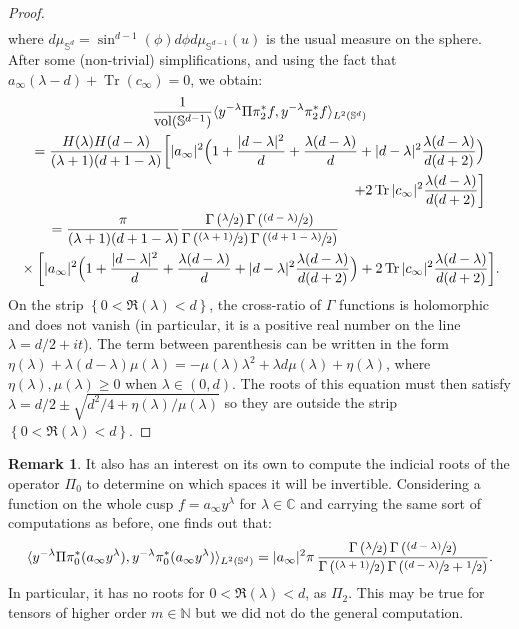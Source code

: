 \documentclass[JEP,XML,SOM,Unicode,NoFloatCountersInSection]{cedram}
\newcommand{\psfrac}[2]{\sfrac{(#1)}{#2}}
\newcommand{\C}{\mathbb{C}}
\newcommand{\N}{\mathbb{N}}
\newcommand{\Ss}{\mathbb{S}}
\DeclareMathOperator{\vol}{\mathrm{vol}}
\DeclareMathOperator{\Tr}{Tr}
\theoremstyle{plain}
\theoremstyle{definition}
\newtheorem{remark}{Remark}[section]
\begin{document}
\begin{proof}
\begin{multline*}
\end{multline*}
where $d\mu_{\Ss^d} = \sin^{d-1}(\phi) d\phi d\mu_{\Ss^{d-1}}(u)$ is the usual measure on the sphere. After some (non-trivial) simplifications, and using the fact that $a_\infty(\lambda-d)+\Tr(c_\infty) = 0$, we obtain:
\begin{multline*}
\frac{1}{\vol(\Ss^{d-1})}\langle y^{-\lambda} \Pi \pi_2^\ast f,y^{-\lambda}\pi_2^\ast f \rangle_{L^2(\Ss^d)} \\
= \dfrac{H(\lambda)H(d-\lambda)}{(\lambda+1)(d+1-\lambda)}\biggl[|a_\infty|^2\Bigl(1+\dfrac{|d-\lambda|^2}{d}+\dfrac{\lambda(d-\lambda)}{d}+|d-\lambda|^2\dfrac{\lambda(d-\lambda)}{d(d+2)}\Bigr)\\
\shoveright{+ 2\Tr |c_\infty|^2 \dfrac{\lambda(d-\lambda)}{d(d+2)} \biggr]} \\
\shoveleft{\hspace*{.5cm}= \dfrac{\pi}{(\lambda+1)(d+1-\lambda)} \dfrac{\Gamma\left(\sfrac{\lambda}{2}\right)\Gamma\left(\psfrac{d-\lambda}{2}\right)}{\Gamma\left(\psfrac{\lambda+1}{2}\right)\Gamma\left(\psfrac{d+1-\lambda}{2}\right)}} \\
{}\times \biggl[|a_\infty|^2\Bigl(1+\dfrac{|d-\lambda|^2}{d}+\dfrac{\lambda(d-\lambda)}{d}+|d-\lambda|^2\dfrac{\lambda(d-\lambda)}{d(d+2)}\Bigr) + 2\Tr |c_\infty|^2 \dfrac{\lambda(d-\lambda)}{d(d+2)} \biggr].
\end{multline*}
On the strip $\left\{0 < \Re(\lambda) < d\right\}$, the cross-ratio of $\Gamma$ functions is holomorphic and does not vanish (in particular, it is a positive real number on the line $\lambda=d/2+it$). The term between parenthesis can be written in the form $\eta(\lambda)+\lambda(d-\lambda)\mu(\lambda) = -\mu(\lambda)\lambda^2 + \lambda d \mu(\lambda) + \eta(\lambda)$, where $\eta(\lambda),\mu(\lambda) \geq 0$ when $\lambda \in (0,d)$. The roots of this equation must then satisfy $\lambda = d/2 \pm \sqrt{d^2/4+\eta(\lambda)/\mu(\lambda)}$ so they are outside the strip $\left\{0 < \Re(\lambda) < d\right\}$.
\end{proof}

\begin{remark}
\label{remark:pi0}
It also has an interest on its own to compute the indicial roots of the operator $\Pi_0$ to determine on which spaces it will be invertible. Considering a function on the whole cusp $f = a_\infty y^\lambda$ for $\lambda \in \C$ and carrying the same sort of computations as before, one finds out that:
\[
\langle y^{-\lambda} \Pi \pi_0^*(a_\infty y^\lambda),y^{-\lambda} \pi_0^*(a_\infty y^\lambda)\rangle_{L^2(\Ss^d)} = |a_\infty|^2 \pi\, \dfrac{\Gamma\left(\sfrac{\lambda}{2}\right)\Gamma\left(\psfrac{d-\lambda}{2}\right)}{\Gamma\left(\psfrac{\lambda+1}{2}\right)\Gamma\left(\psfrac{d-\lambda}{2}+\sfrac{1}{2}\right)}.
\]
In particular, it has no roots for $0 < \Re(\lambda) < d$, as $\Pi_2$. This may be true for tensors of higher order $m \in \N$ but we did not do the general computation.
\end{remark}
\end{document}
